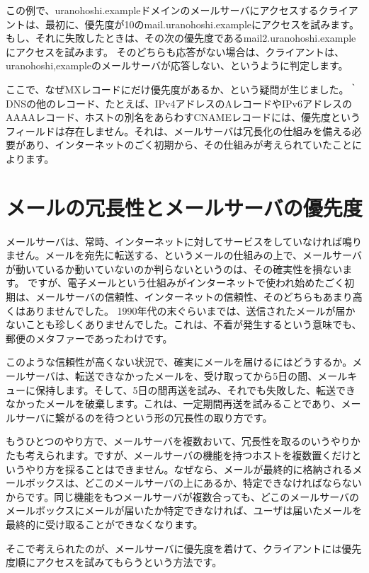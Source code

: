 この例で、uranohoshi.exampleドメインのメールサーバにアクセスするクライアントは、最初に、優先度が10のmail.uranohoshi.exampleにアクセスを試みます。もし、それに失敗したときは、その次の優先度であるmail2.uranohoshi.exampleにアクセスを試みます。
そのどちらも応答がない場合は、クライアントは、uranohoshi,exampleのメールサーバが応答しない、というように判定します。

ここで、なぜMXレコードにだけ優先度があるか、という疑問が生じました。｀DNSの他のレコード、たとえば、IPv4アドレスのAレコードやIPv6アドレスのAAAAレコード、ホストの別名をあらわすCNAMEレコードには、優先度というフィールドは存在しません。それは、メールサーバは冗長化の仕組みを備える必要があり、インターネットのごく初期から、その仕組みが考えられていたことによります。

\section{メールの冗長性とメールサーバの優先度}

メールサーバは、常時、インターネットに対してサービスをしていなければ鳴りません。メールを宛先に転送する、というメールの仕組みの上で、メールサーバが動いているか動いていないのか判らないというのは、その確実性を損ないます。
ですが、電子メールという仕組みがインターネットで使われ始めたごく初期は、メールサーバの信頼性、インターネットの信頼性、そのどちらもあまり高くはありませんでした。
1990年代の末ぐらいまでは、送信されたメールが届かないことも珍しくありませんでした。これは、不着が発生するという意味でも、郵便のメタファーであったわけです。

このような信頼性が高くない状況で、確実にメールを届けるにはどうするか。メールサーバは、転送できなかったメールを、受け取ってから5日の間、メールキューに保持します。そして、5日の間再送を試み、それでも失敗した、転送できなかったメールを破棄します。これは、一定期間再送を試みることであり、メールサーバに繋がるのを待つという形の冗長性の取り方です。

もうひとつのやり方で、メールサーバを複数おいて、冗長性を取るのいうやりかたも考えられます。ですが、メールサーバの機能を持つホストを複数置くだけというやり方を採ることはできません。なぜなら、メールが最終的に格納されるメールボックスは、どこのメールサーバの上にあるか、特定できなければならないからです。同じ機能をもつメールサーバが複数合っても、どこのメールサーバのメールボックスにメールが届いたか特定できなければ、ユーザは届いたメールを最終的に受け取ることができなくなります。

そこで考えられたのが、メールサーバに優先度を着けて、クライアントには優先度順にアクセスを試みてもらうという方法です。

